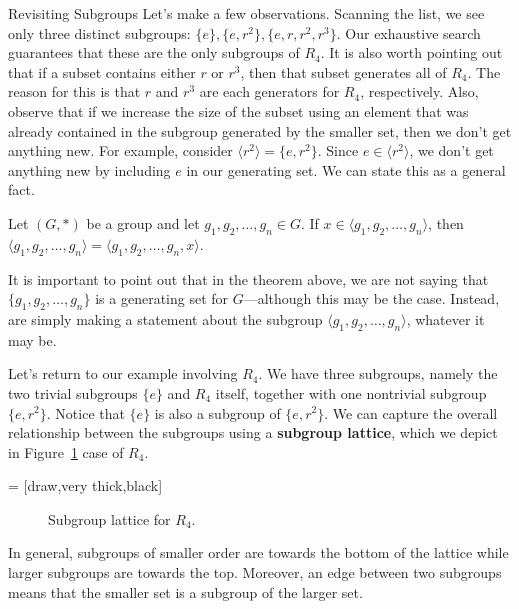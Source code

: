 \begin{section}{Revisiting Subgroups}
Let's make a few observations.  Scanning the list, we see only three distinct subgroups: $\{e\}, \{e,r^2\},\{e,r,r^2,r^3\}$.  Our exhaustive search guarantees that these are the only subgroups of $R_4$.  It is also worth pointing out that if a subset contains either $r$ or $r^3$, then that subset generates all of $R_4$.  The reason for this is that $r$ and $r^3$ are each generators for $R_4$, respectively.  Also, observe that if we increase the size of the subset using an element that was already contained in the subgroup generated by the smaller set, then we don't get anything new.  For example, consider $\langle r^2\rangle=\{e,r^2\}$.  Since $e\in\langle r^2\rangle$, we don't get anything new by including $e$ in our generating set.  We can state this as a general fact.

\begin{theorem}
Let $(G,*)$ be a group and let $g_1,g_2,\ldots,g_n\in G$.  If $x\in\langle g_1,g_2,\ldots,g_n\rangle$, then $\langle g_1,g_2,\ldots,g_n\rangle = \langle g_1,g_2,\ldots,g_n,x\rangle$.
\end{theorem}

It is important to point out that in the theorem above, we are not saying that $\{g_1,g_2,\ldots,g_n\}$ is a generating set for $G$---although this may be the case.  Instead, are simply making a statement about the subgroup $\langle g_1,g_2,\ldots,g_n\rangle$, whatever it may be.

Let's return to our example involving $R_4$.  We have three subgroups, namely the two trivial subgroups $\{e\}$ and $R_4$ itself, together with one nontrivial subgroup $\{e,r^2\}$.  Notice that $\{e\}$ is also a subgroup of $\{e,r^2\}$.  We can capture the overall relationship between the subgroups using a \textbf{subgroup lattice}, which we depict in Figure~\ref{fig:latticeR4} case of $R_4$.

 = [draw,very thick,black]

\begin{figure}[!ht]
\centering
{}
\caption{Subgroup lattice for $R_4$.}
\label{fig:latticeR4}
\end{figure}

In general, subgroups of smaller order are towards the bottom of the lattice while larger subgroups are towards the top.  Moreover, an edge between two subgroups means that the smaller set is a subgroup of the larger set.


\end{section}
